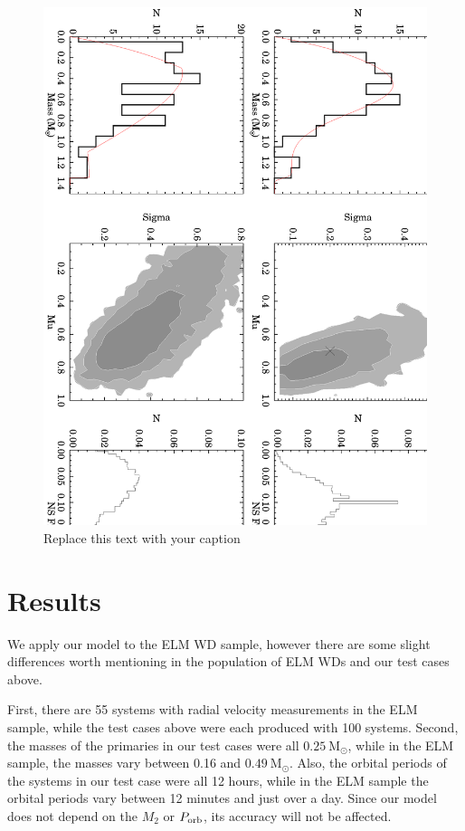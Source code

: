 \documentclass[letterpaper,12pt,preprint]{aastex}
\newcommand{\Msun}{\mathrm{M}_\odot}
\begin{document}
\begin{figure}[h!]
\begin{center}
\includegraphics[width=1\columnwidth]{model_post.eps}
\caption{Replace this text with your caption}
\end{center}
\end{figure}

\section{Results}

We apply our model to the ELM WD sample, however there are some slight differences worth mentioning in the population of ELM WDs and our test cases above. 

First, there are 55 systems with radial velocity measurements in the ELM sample, while the test cases above were each produced with 100 systems. Second, the masses of the primaries in our test cases were all $0.25~\Msun$, while in the ELM sample, the masses vary between 0.16 and $0.49~\Msun$. Also, the orbital periods of the systems in our test case were all 12 hours, while in the ELM sample the orbital periods vary between 12 minutes and just over a day. Since our model does not depend on the $M_2$ or $P_{\rm orb}$, its accuracy will not be affected. 
\end{document}
